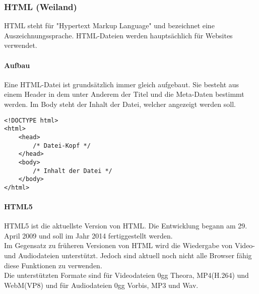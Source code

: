 \subsubsection{HTML (Weiland)}

HTML steht für "Hypertext Markup Language" und bezeichnet eine Auszeichnungssprache. HTML-Dateien werden hauptsächlich für Websites verwendet.


\paragraph{Aufbau}

Eine HTML-Datei ist grundsätzlich immer gleich aufgebaut. Sie besteht aus einem Header in dem unter Anderem der Titel und die Meta-Daten bestimmt werden.
Im Body steht der Inhalt der Datei, welcher angezeigt werden soll. 
\begin{lstlisting}[style=customHTML, caption={HTML-Tags}]
<!DOCTYPE html>
<html> 
	<head>
		/* Datei-Kopf */
	</head>
	<body>
		/* Inhalt der Datei */
	</body>
</html>
\end{lstlisting}

\paragraph{HTML5}
HTML5 ist die aktuellste Version von HTML. Die Entwicklung begann am 29. April 2009 und soll im Jahr 2014 fertiggestellt werden.\\
Im Gegensatz zu früheren Versionen von HTML wird die Wiedergabe von Video- und Audiodateien unterstützt. Jedoch sind aktuell noch nicht alle Browser fähig diese Funktionen zu verwenden.\\
Die unterstützten Formate sind für Videodateien 0gg Theora, MP4(H.264) und WebM(VP8) und für Audiodateien 0gg Vorbis, MP3 und Wav. \\
